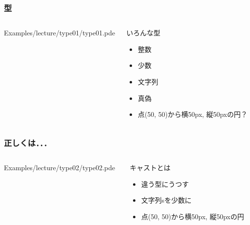 \documentclass[10pt, dvipdfmx]{beamer}
\begin{document}
        \begin{frame}
            \frametitle{型}
            \begin{columns}[c]
                \begin{column}{0.50\textwidth}
                    \tiny
                    Examples/lecture/type01/type01.pde
                    \scriptsize
                \end{column}
                \begin{column}{0.50\textwidth}
                    \begin{block}{いろんな型}
                        \begin{itemize}
                            \item 整数
                            \item 少数
                            \item 文字列
                            \item 真偽
                            \item 点(50, 50)から横50px, 縦50pxの円？
                        \end{itemize}
                    \end{block}
                \end{column}
            \end{columns}
        \end{frame}

        \begin{frame}
            \frametitle{正しくは．．．}
            \begin{columns}[c]
                \begin{column}{0.50\textwidth}
                    \tiny
                    Examples/lecture/type02/type02.pde
                    \scriptsize
                \end{column}
                \begin{column}{0.50\textwidth}
                    \begin{block}{キャストとは}
                        \begin{itemize}
                            \item 違う型にうつす
                            \item 文字列sを少数に
                            \item 点(50, 50)から横50px, 縦50pxの円
                        \end{itemize}
                    \end{block}
                \end{column}
            \end{columns}
        \end{frame}
\end{document}
